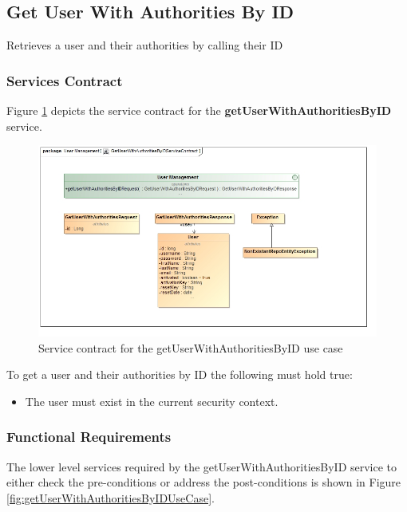 \subsection{Get User With Authorities By ID}
Retrieves a user and their authorities by calling their ID

\subsubsection{Services Contract}
Figure \ref{fig:GetUserWithAuthoritiesByIDServicesContract} depicts the service contract for the \textbf{getUserWithAuthoritiesByID} service.

\begin{figure}[H]
	\begin{center}
		\includegraphics[scale=0.55]{../Diagrams and Charts/Users/Get User With Authorities By ID Service Contract.jpg}
		\caption{Service contract for the getUserWithAuthoritiesByID use case}
		\label{fig:GetUserWithAuthoritiesByIDServicesContract}
	\end{center}
\end{figure}

To get a user and their authorities by ID the following must hold true:
\begin{itemize}
	\item The user must exist in the current security context.
\end{itemize}

\subsubsection{Functional Requirements}
The lower level services required by the getUserWithAuthoritiesByID service to either check the
pre-conditions or address the post-conditions is shown in Figure \ref{fig:getUserWithAuthoritiesByIDUseCase}.

